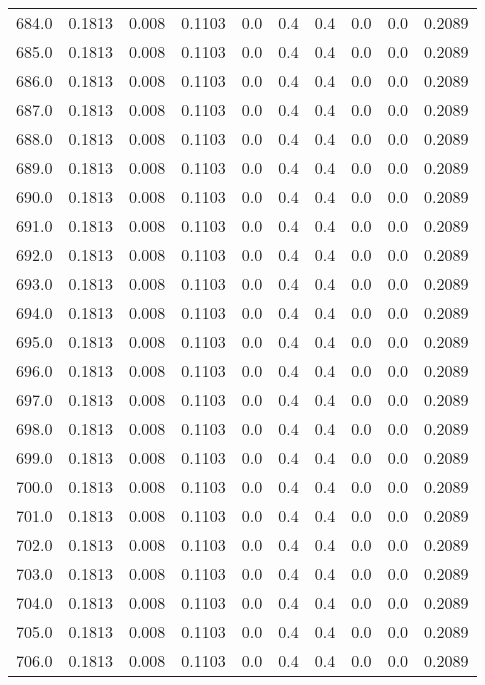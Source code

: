 \begin{longtable}{lrrrrrrrrr}
684.0 & 0.1813 & 0.008 & 0.1103 & 0.0 & 0.4 & 0.4 & 0.0 & 0.0 & 0.2089 \\
685.0 & 0.1813 & 0.008 & 0.1103 & 0.0 & 0.4 & 0.4 & 0.0 & 0.0 & 0.2089 \\
686.0 & 0.1813 & 0.008 & 0.1103 & 0.0 & 0.4 & 0.4 & 0.0 & 0.0 & 0.2089 \\
687.0 & 0.1813 & 0.008 & 0.1103 & 0.0 & 0.4 & 0.4 & 0.0 & 0.0 & 0.2089 \\
688.0 & 0.1813 & 0.008 & 0.1103 & 0.0 & 0.4 & 0.4 & 0.0 & 0.0 & 0.2089 \\
689.0 & 0.1813 & 0.008 & 0.1103 & 0.0 & 0.4 & 0.4 & 0.0 & 0.0 & 0.2089 \\
690.0 & 0.1813 & 0.008 & 0.1103 & 0.0 & 0.4 & 0.4 & 0.0 & 0.0 & 0.2089 \\
691.0 & 0.1813 & 0.008 & 0.1103 & 0.0 & 0.4 & 0.4 & 0.0 & 0.0 & 0.2089 \\
692.0 & 0.1813 & 0.008 & 0.1103 & 0.0 & 0.4 & 0.4 & 0.0 & 0.0 & 0.2089 \\
693.0 & 0.1813 & 0.008 & 0.1103 & 0.0 & 0.4 & 0.4 & 0.0 & 0.0 & 0.2089 \\
694.0 & 0.1813 & 0.008 & 0.1103 & 0.0 & 0.4 & 0.4 & 0.0 & 0.0 & 0.2089 \\
695.0 & 0.1813 & 0.008 & 0.1103 & 0.0 & 0.4 & 0.4 & 0.0 & 0.0 & 0.2089 \\
696.0 & 0.1813 & 0.008 & 0.1103 & 0.0 & 0.4 & 0.4 & 0.0 & 0.0 & 0.2089 \\
697.0 & 0.1813 & 0.008 & 0.1103 & 0.0 & 0.4 & 0.4 & 0.0 & 0.0 & 0.2089 \\
698.0 & 0.1813 & 0.008 & 0.1103 & 0.0 & 0.4 & 0.4 & 0.0 & 0.0 & 0.2089 \\
699.0 & 0.1813 & 0.008 & 0.1103 & 0.0 & 0.4 & 0.4 & 0.0 & 0.0 & 0.2089 \\
700.0 & 0.1813 & 0.008 & 0.1103 & 0.0 & 0.4 & 0.4 & 0.0 & 0.0 & 0.2089 \\
701.0 & 0.1813 & 0.008 & 0.1103 & 0.0 & 0.4 & 0.4 & 0.0 & 0.0 & 0.2089 \\
702.0 & 0.1813 & 0.008 & 0.1103 & 0.0 & 0.4 & 0.4 & 0.0 & 0.0 & 0.2089 \\
703.0 & 0.1813 & 0.008 & 0.1103 & 0.0 & 0.4 & 0.4 & 0.0 & 0.0 & 0.2089 \\
704.0 & 0.1813 & 0.008 & 0.1103 & 0.0 & 0.4 & 0.4 & 0.0 & 0.0 & 0.2089 \\
705.0 & 0.1813 & 0.008 & 0.1103 & 0.0 & 0.4 & 0.4 & 0.0 & 0.0 & 0.2089 \\
706.0 & 0.1813 & 0.008 & 0.1103 & 0.0 & 0.4 & 0.4 & 0.0 & 0.0 & 0.2089 \\

\end{longtable}
